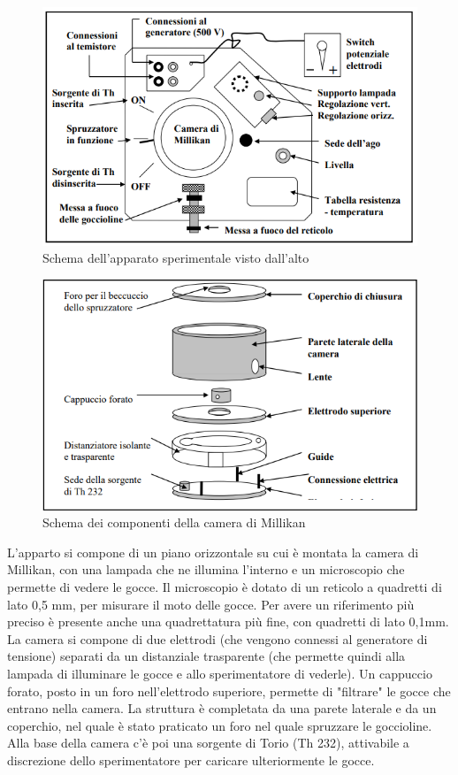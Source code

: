 \documentclass{article}
\begin{document}
\begin{figure}[h]
\centering
\includegraphics[scale=0.7]{SchemaMillikan1}
\caption{Schema dell'apparato sperimentale visto dall'alto}
\end{figure}

\begin{figure}[h!]
\centering
\includegraphics[scale=0.7]{SchemaMillikan2}
\caption{Schema dei componenti della camera di Millikan}
\end{figure}

L'apparto si compone di un piano orizzontale su cui è montata la camera di Millikan, con una lampada che ne illumina l'interno e un microscopio che permette di vedere le gocce. Il microscopio è dotato di un reticolo a quadretti di lato 0,5 mm, per misurare il moto delle gocce. Per avere un riferimento più preciso è presente anche una quadrettatura più fine, con quadretti di lato 0,1mm. La camera si compone di due elettrodi (che vengono connessi al generatore di tensione) separati da un distanziale trasparente (che permette quindi alla lampada di illuminare le gocce e allo sperimentatore di vederle). Un cappuccio forato, posto in un foro nell'elettrodo superiore, permette di "filtrare" le gocce che entrano nella camera. La struttura è completata da una parete laterale e da un coperchio, nel quale è stato praticato un foro nel quale spruzzare le goccioline. Alla base della camera c'è poi una sorgente di Torio (Th 232), attivabile a discrezione dello sperimentatore per caricare ulteriormente le gocce.
\end{document}
